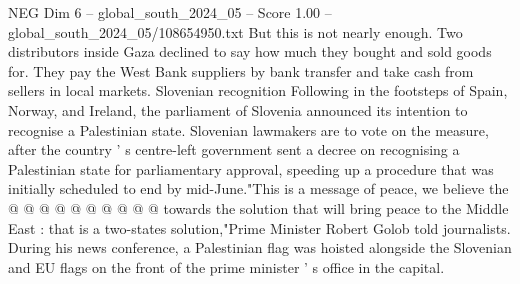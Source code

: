 \begin{textsample}{NEG Dim 6 – global\_south\_2024\_05 – Score 1.00 – global\_south\_2024\_05/108654950.txt}
But this is not nearly enough.
Two distributors inside Gaza declined to say how much they bought and sold goods for.
They pay the West Bank suppliers by bank transfer and take cash from sellers in local markets.
Slovenian recognition Following in the footsteps of Spain, Norway, and Ireland, the parliament of Slovenia announced its intention to recognise a Palestinian state.
Slovenian lawmakers are to vote on the measure, after the country ' s centre-left government sent a decree on recognising a Palestinian state for parliamentary approval, speeding up a procedure that was initially scheduled to end by mid-June."This is a message of peace, we believe the @ @ @ @ @ @ @ @ @ @ towards the solution that will bring peace to the Middle East : that is a two-states solution,"Prime Minister Robert Golob told journalists.
During his news conference, a Palestinian flag was hoisted alongside the Slovenian and EU flags on the front of the prime minister ' s office in the capital.

\end{textsample}

